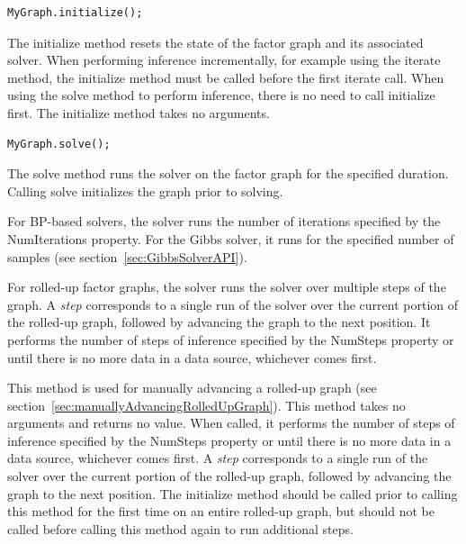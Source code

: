 \fi


\begin{lstlisting}
MyGraph.initialize();
\end{lstlisting}

The initialize method resets the state of the factor graph and its associated solver.  When performing inference incrementally, for example using the iterate method, the initialize method must be called before the first iterate call.  When using the solve method to perform inference, there is no need to call initialize first.  The initialize method takes no arguments.

\label{sec:FactorGraph.solve}

\begin{lstlisting}
MyGraph.solve();
\end{lstlisting}

The solve method runs the solver on the factor graph for the specified duration.  Calling solve initializes the graph prior to solving.

For BP-based solvers, the solver runs the number of iterations specified by the NumIterations property.  For the Gibbs solver, it runs for the specified number of samples (see section~\ref{sec:GibbsSolverAPI}).

For rolled-up factor graphs, the solver runs the solver over multiple steps of the graph.  A \emph{step} corresponds to a single run of the solver over the current portion of the rolled-up graph, followed by advancing the graph to the next position.  It performs the number of steps of inference specified by the NumSteps property or until there is no more data in a data source, whichever comes first.


\label{sec:FactorGraph.continueSolve}

This method is used for manually advancing a rolled-up graph (see section~\ref{sec:manuallyAdvancingRolledUpGraph}).  This method takes no arguments and returns no value.  When called, it performs the number of steps of inference specified by the NumSteps property or until there is no more data in a data source, whichever comes first.  A \emph{step} corresponds to a single run of the solver over the current portion of the rolled-up graph, followed by advancing the graph to the next position.  The initialize method should be called prior to calling this method for the first time on an entire rolled-up graph, but should not be called before calling this method again to run additional steps.

